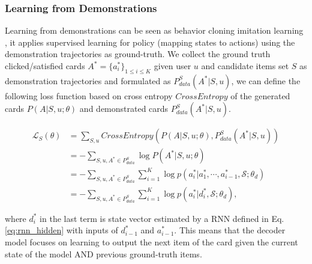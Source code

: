 \subsubsection{Learning from Demonstrations}
\label{sec:supervise}
Learning from demonstrations can be seen as behavior cloning imitation learning \cite{torabi2018behavioral},
it applies supervised learning for policy (mapping states to actions)
using the demonstration trajectories as ground-truth.
We collect the ground truth clicked/satisfied cards $A^*=\{a_i^*\}_{1\leq i\leq K}$ given user $u$ and candidate items set $S$ as
demonstration trajectories and formulated as $P_{data}^{S}(A^*|S,u)$,
we can define the following loss function based on cross entropy $CrossEntropy$ of the generated cards $P(A|S,u;\theta)$ and demonstrated cards $P^S_{data}(A^*|S,u)$.
\begin{small}
\begin{equation}
\begin{aligned}
\mathcal{L}_{S}(\theta)&=\sum_{S,u}{CrossEntropy(P(A|S,u;\theta),P_{data}^{S}(A^*|S,u))} \\
&= -\sum_{S,u,A^*\in P_{data}^{S}}\log{P(A^*|S,u;\theta)} \\
&= -\sum_{S,u,A^*\in P_{data}^{S}}\sum_{i=1}^{K}\log{p(a_i^*|a_1^*,\cdots,a_{i-1}^*,\mathcal{S};\theta_d)} \\
&= -\sum_{S,u,A^*\in P_{data}^{S}}\sum_{i=1}^{K}\log{p(a_i^*|d_i^*,\mathcal{S};\theta_d)},
\end{aligned}
\label{eq:cross_entropy}
\end{equation}
\end{small}
where $d_i^*$ in the last term is state vector estimated by a RNN defined in Eq. \ref{eq:rnn_hidden} with inputs of $d_{i-1}^*$ and $a_{i-1}^*$.
This means that the decoder model focuses on learning to output the next item of the card given the current state of the model
AND previous ground-truth items.

